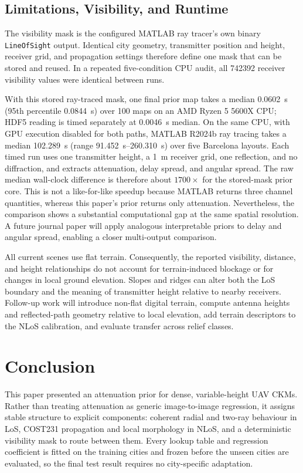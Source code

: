 \documentclass[10pt,conference]{IEEEtran}
\begin{document}
\subsection{Limitations, Visibility, and Runtime}
\label{sec:limitations}

The visibility mask is the configured MATLAB ray tracer's own binary
\texttt{LineOfSight} output. Identical city geometry, transmitter position and
height, receiver grid, and propagation settings therefore define one mask that
can be stored and reused. In a repeated five-condition CPU audit, all
\num{742392}
receiver visibility values were identical between runs.

With this stored ray-traced mask, one final prior map takes a median \SI{0.0602}{s}
(95th percentile \SI{0.0844}{s}) over 100 maps on an AMD Ryzen 5 5600X CPU;
HDF5 reading is timed separately at \SI{0.0046}{s} median. On the same CPU,
with GPU execution disabled for both paths, MATLAB R2024b ray tracing takes a
median \SI{102.289}{s} (range \SIrange{91.452}{260.310}{s}) over five Barcelona
layouts. Each timed run uses one transmitter height, a \SI{1}{m} receiver
grid, one reflection, and no diffraction, and extracts attenuation, delay
spread, and angular spread. The raw median wall-clock difference is therefore
about $1700\times$ for the stored-mask prior core. This is not a like-for-like
speedup because MATLAB returns three channel quantities, whereas this paper's
prior returns only attenuation. Nevertheless, the comparison shows a
substantial computational gap at the same spatial resolution. A future journal
paper will apply analogous
interpretable priors to delay and angular spread, enabling a closer
multi-output comparison.

All current scenes use flat terrain. Consequently, the reported visibility,
distance, and height relationships do not account for terrain-induced blockage
or for changes in local ground elevation. Slopes and ridges can alter both the
LoS boundary and the meaning of transmitter height relative to nearby
receivers. Follow-up work will introduce non-flat digital terrain, compute
antenna heights and reflected-path geometry relative to local elevation, add
terrain descriptors to the NLoS calibration, and evaluate transfer across
relief classes.

\section{Conclusion}

This paper presented an attenuation prior for dense, variable-height UAV CKMs.
Rather than treating attenuation as generic image-to-image regression, it
assigns stable structure to explicit components: coherent radial and two-ray
behaviour in LoS, COST231 propagation and local morphology in NLoS, and a
deterministic visibility mask to route between them. Every lookup table and
regression coefficient is fitted on the training cities and frozen before the
unseen cities are evaluated, so the final test result requires no city-specific
adaptation.
\end{document}
